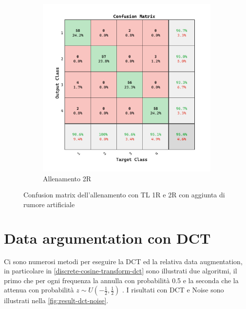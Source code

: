 \begin{figure}[ht]
\begin{subfigure}{0.45\textwidth}
        \includegraphics[width=\textwidth]{addestramento-rete-neurale/two-noise.pdf}
        \caption{Allenamento 2R} 
    \end{subfigure}
    \caption{Confusion matrix dell'allenamento con TL 1R e 2R con aggiunta di rumore artificiale}
    \label{fig:result-noise}
\end{figure}

\section{Data argumentation con DCT}\label{data-argumentation-con-dct}

Ci sono numerosi metodi per eseguire la DCT ed la relativa data augmentation, in particolare in \cref{discrete-cosine-transform-dct} sono illustrati due algoritmi, il primo che per ogni frequenza la annulla con probabilità 0.5 e la seconda che la attenua con probabilità \(z\sim U\left(-\frac{1}{2}, \frac{1}{2}\right)\) \cite{nanni_dct_pca}. I risultati con DCT e Noise sono illustrati nella \cref{fig:result-dct-noise}.

